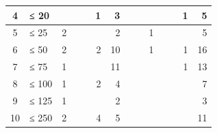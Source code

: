 {\begin{table}
\begin{tabular}{
	c
	l
	r r c
	r r c
	r r c
	r r
	r
}
\midrule

4
	& ≤ 20
	& %
	& %
	& %
	& 1 %
	& 3 %
	& %
	& %
	& %
	& %
	& %
	& 1 %
	& 5
	\\

\midrule

5
	& ≤ 25
	& 2 %
	& %
	& %
	& %
	& 2 %
	& %
	& %
	& 1 %
	& %
	& %
	& %
	& 5
	\\

\midrule

6
	& ≤ 50
	& 2 %
	& %
	& %
	& 2 %
	& 10 %
	& %
	& %
	& 1 %
	& %
	& %
	& 1 %
	& 16
	\\

\midrule

7
	& ≤ 75
	& 1 %
	& %
	& %
	& %
	& 11 %
	& %
	& %
	& %
	& %
	& %
	& 1 %
	& 13
	\\

\midrule

8
	& ≤ 100
	& 1 %
	& %
	& %
	& 2 %
	& 4 %
	& %
	& %
	& %
	& %
	& %
	& %
	& 7
	\\

\midrule

9
	& ≤ 125
	& 1 %
	& %
	& %
	& %
	& 2 %
	& %
	& %
	& %
	& %
	& %
	& %
	& 3
	\\

\midrule

10
	& ≤ 250
	& 2 %
	& %
	& %
	& 4 %
	& 5 %
	& %
	& %
	& %
	& %
	& %
	& %
	& 11
	\\


\end{tabular}
\end{table}}
